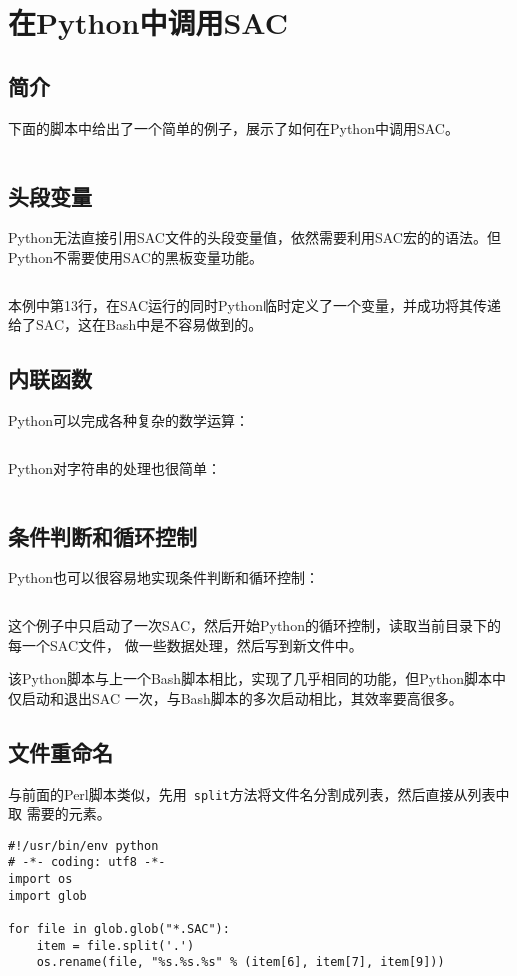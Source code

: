 \section{在Python中调用SAC}
\label{sec:sac-python}

\subsection{简介}
下面的脚本中给出了一个简单的例子，展示了如何在Python中调用SAC。
\inputminted{python}{./call-in-script/simple-script.py}

\subsection{头段变量}
Python无法直接引用SAC文件的头段变量值，依然需要利用SAC宏的的语法。但Python不需要使用SAC的黑板变量功能。
\inputminted{python}{./call-in-script/variables.py}
本例中第13行，在SAC运行的同时Python临时定义了一个变量，并成功将其传递给了SAC，这在Bash中是不容易做到的。

\subsection{内联函数}
Python可以完成各种复杂的数学运算：
\inputminted{python}{./call-in-script/arithmetic-functions.py}

Python对字符串的处理也很简单：
\inputminted{python}{./call-in-script/string-functions.py}

\subsection{条件判断和循环控制}
Python也可以很容易地实现条件判断和循环控制：
\inputminted{python}{./call-in-script/do-loops.py}
这个例子中只启动了一次SAC，然后开始Python的循环控制，读取当前目录下的每一个SAC文件，
做一些数据处理，然后写到新文件中。

该Python脚本与上一个Bash脚本相比，实现了几乎相同的功能，但Python脚本中仅启动和退出SAC
一次，与Bash脚本的多次启动相比，其效率要高很多。

\subsection{文件重命名}
\label{subsec:rename-in-python}
与前面的Perl脚本类似，先用~\verb+split+方法将文件名分割成列表，然后直接从列表中取
需要的元素。
\begin{verbatim}
#!/usr/bin/env python
# -*- coding: utf8 -*-
import os
import glob

for file in glob.glob("*.SAC"):
    item = file.split('.')
    os.rename(file, "%s.%s.%s" % (item[6], item[7], item[9]))
\end{verbatim}
